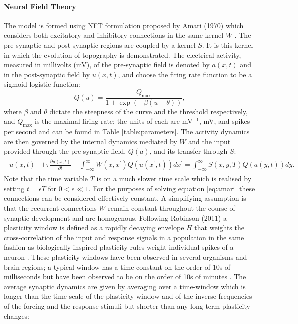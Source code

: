 \paragraph{Neural Field Theory}
The model is formed using NFT formulation proposed by Amari (1970) which considers both excitatory and inhibitory connections in the same kernel $W$ \cite{Amari1977-gc}. The pre-synaptic and post-synaptic regions are coupled by a kernel $S$. It is this kernel in which the evolution of topography is demonstrated. The electrical activity, measured in millivolts (mV), of the pre-synaptic field is denoted by $a(x,t)$ and in the post-synaptic field by $u(x,t)$, and choose the firing rate function to be a sigmoid-logistic function:
\begin{equation}
	Q(u)=\frac{Q_\text{max}}{1+\exp(-\beta(u-\theta))},
\end{equation} 
where $\beta$ and $\theta$ dictate the steepness of the curve and the threshold respectively, and $Q_{\text{max}}$ is the maximal firing rate; { the units of each are mV$^{-1}$, mV, and spikes per second and can be found in Table \ref{table:parameters}}. The activity dynamics are then governed by the internal dynamics mediated by $W$ and the input provided through the pre-synaptic field, $Q(a)$, and its transfer through $S$:
\begin{align}
	\begin{split}
		u(x,t)&
		+\tau \frac{\partial u(x,t)}{\partial t} 
		- \int_{-\infty}^{\infty} W(x, x^\prime) Q(u(x^\prime,t)) dx^\prime = \int_{-\infty}^{\infty}S(x,y, T) Q(a(y,t)) dy.
	\end{split}
	\label{eq:amari}
\end{align}
Note that the time variable $T$ is on a much slower time scale which is realised by setting $t=\epsilon T$ for $0<\epsilon \ll 1$. For the purposes of solving equation \ref{eq:amari} these connections can be considered effectively constant. A simplifying assumption is that the recurrent connections $W$ remain constant throughout the course of synaptic development and are homogenous. Following Robinson (2011) a plasticity window is defined as a rapidly decaying envelope $H$ that weights the cross-correlation of the input and response signals in a population in the same fashion as biologically-inspired plasticity rules weight individual spikes of a neuron \cite{Robinson2011-ve}. { These plasticity windows have been observed in several organisms and brain regions; a typical window has a time constant on the order of 10s of milliseconds but have been observed to be on the order of 10s of minutes \cite{Froemke2002-be, Zhang2000-lb, Allen2003-rw, Markram1997-ln, Citri2008-kv}}. The average synaptic dynamics are given by averaging over a time-window which is longer than the time-scale of the plasticity window and of the inverse frequencies of the forcing and the response stimuli but shorter than any long term plasticity changes:
